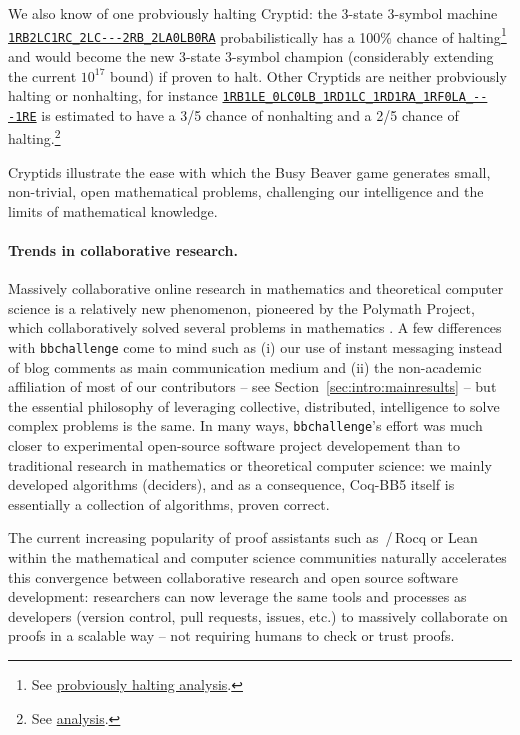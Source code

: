 \documentclass[a4paper,british]{article}
\theoremstyle{definition} %
\numberwithin{equation}{section}
\theoremstyle{definition} %
\newcommand{\tm}[1]{\href{https://bbchallenge.org/#1}{\texttt{\nolinkurl{#1}}}}
\newcommand{\CoqBB}{Coq-BB5\xspace}
\begin{document}
We also know of one probviously halting Cryptid: the 3-state 3-symbol machine \tm{1RB2LC1RC_2LC---2RB_2LA0LB0RA} probabilistically has a 100\% chance of halting\footnote{See \href{https://wiki.bbchallenge.org/wiki/1RB2LC1RC_2LC---2RB_2LA0LB0RA}{probviously halting analysis}.} and would become the new 3-state 3-symbol champion (considerably extending the current $10^{17}$ bound) if proven to halt. Other Cryptids are neither probviously halting or nonhalting, for instance \tm{1RB1LE_0LC0LB_1RD1LC_1RD1RA_1RF0LA_---1RE} is estimated to have a 3/5 chance of nonhalting and a 2/5 chance of halting.\footnote{See \href{https://wiki.bbchallenge.org/wiki/1RB1LE_0LC0LB_1RD1LC_1RD1RA_1RF0LA_---1RE}{analysis}.}

Cryptids illustrate the ease with which the Busy Beaver game generates small, non-trivial, open mathematical problems, challenging our intelligence and the limits of mathematical knowledge.

\paragraph{Trends in collaborative research.} Massively collaborative online research in mathematics and theoretical computer science is a relatively new phenomenon, pioneered by the Polymath Project, which collaboratively solved several problems in mathematics \cite{Gowers2009}. A few differences with \texttt{bbchallenge} come to mind such as (i) our use of instant messaging instead of blog comments as main communication medium and (ii) the non-academic affiliation of most of our contributors -- see Section~\ref{sec:intro:mainresults} -- but the essential philosophy of leveraging collective, distributed, intelligence to solve complex problems is the same. In many ways, \texttt{bbchallenge}'s effort was much closer to experimental open-source software project developement than to traditional research in mathematics or theoretical computer science: we mainly developed algorithms (deciders), and as a consequence, \CoqBB itself is essentially a collection of algorithms, proven correct.

The current increasing popularity of proof assistants such as \Coq\,/\,Rocq or Lean within the mathematical and computer science communities naturally accelerates this convergence between collaborative research and open source software development: researchers can now leverage the same tools and processes as developers (version control, pull requests, issues, etc.) to massively collaborate on proofs in a scalable way -- \ie not requiring humans to check or trust proofs.
\end{document}
